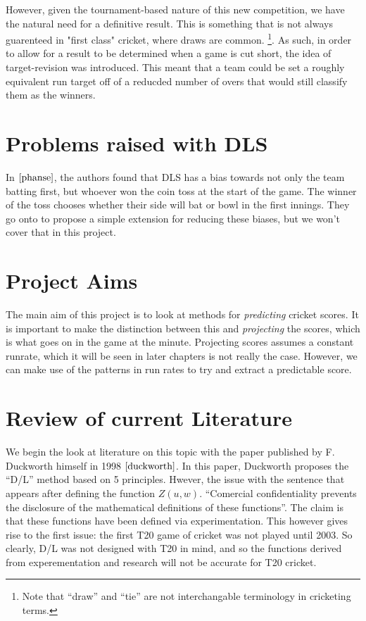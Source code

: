 However, given the tournament-based nature of this new competition, we have the natural need for a definitive result.
This is something that is not always guarenteed in "first class" cricket, where draws are common. \footnote{Note that 
``draw'' and ``tie'' are not interchangable terminology in cricketing terms.}. As such, in order to allow for a result to be
determined when a game is cut short, the idea of target-revision was introduced. This meant that a team could be set a
roughly equivalent run target off of a reducded number of overs that would still classify them as the winners.

\section{Problems raised with DLS}
In $\cite{phanse}$, the authors found that DLS has a bias towards not only the team batting first, but whoever won the coin toss at the start of the game.
The winner of the toss chooses whether their side will bat or bowl in the first innings. They go onto to propose a simple extension for reducing
these biases, but we won't cover that in this project. 

\section{Project Aims}
The main aim of this project is to look at methods for \textit{predicting} cricket scores. It is important to make the distinction between this 
and \textit{projecting} the scores, which is what goes on in the game at the minute. Projecting scores assumes a constant runrate, which it will be seen 
in later chapters is not really the case. However, we can make use of the patterns in run rates to try and extract a predictable score. 


\section{Review of current Literature}
We begin the look at literature on this topic with the paper published by F. Duckworth himself in 1998 $\cite{duckworth}$. In this paper, 
Duckworth proposes the ``D/L'' method based on 5 principles. Hwever, the issue with the sentence that appears after defining the function $Z(u,w)$.
``Comercial confidentiality prevents the disclosure of the mathematical definitions of these functions''. The claim is that these functions have been 
defined via experimentation. This however gives rise to the first issue: the first T20 game of cricket was not played until 2003. So clearly, D/L was not
designed with T20 in mind, and so the functions derived from experementation and research will not be accurate for T20 cricket. \\

